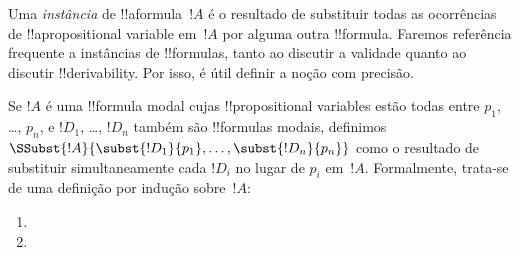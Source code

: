 \documentclass[../../../include/open-logic-section]{subfiles}
\begin{document}


Uma \emph{instância} de !!a{formula}~$!A$ é o resultado de substituir
todas as ocorrências de !!a{propositional variable} em~$!A$ por alguma
outra !!{formula}. Faremos referência frequente a instâncias de
!!{formula}s, tanto ao discutir a validade quanto ao discutir
!!{derivability}. Por isso, é útil definir a noção com precisão.

\begin{defn}
  Se $!A$ é uma !!{formula} modal cujas !!{propositional variable}s
  estão todas entre $p_1$, \dots, $p_n$, e $!D_1$, \dots, $!D_n$
  também são !!{formula}s modais, definimos
  $\SSubst{!A}{\subst{!D_1}{p_1}, \dots, \subst{!D_n}{p_n}}$ como o
  resultado de substituir simultaneamente cada $!D_i$ no lugar de $p_i$
  em~$!A$. Formalmente, trata-se de uma definição por indução sobre~$!A$:
  \begin{enumerate}
    \item {}
    \item {}
\end{enumerate}
\end{defn}
\end{document}
